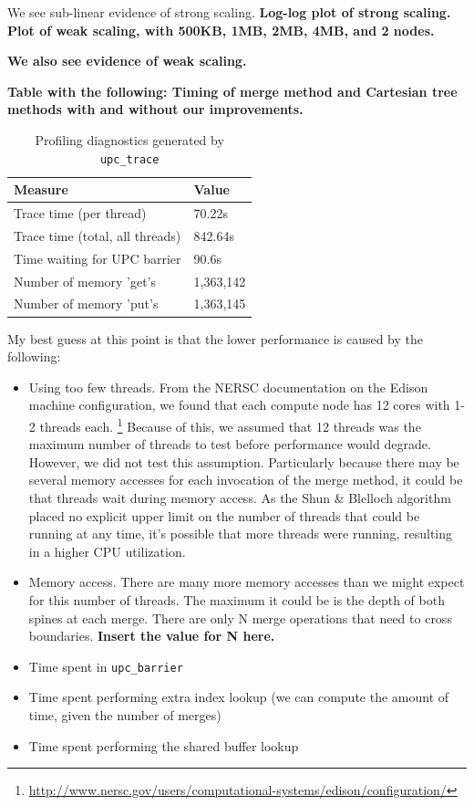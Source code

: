\documentclass[10pt]{article}
\begin{document}
We see sub-linear evidence of strong scaling.
\textbf{%
Log-log plot of strong scaling.
Plot of weak scaling, with 500KB, 1MB, 2MB, 4MB, and 2 nodes.
}

\textbf{%
We also see evidence of weak scaling.
}

\textbf{%
Table with the following:
Timing of merge method and Cartesian tree methods with and without our improvements.
}

\begin{table}[t]
\caption{Profiling diagnostics generated by \texttt{upc\_trace}}
\vspace{1.5ex}
\label{tab:profiling_diagnostics}
\centering
\begin{tabular}{ll}
\toprule
\textbf{Measure} & \textbf{Value} \\
\midrule
Trace time (per thread) & 70.22s \\ \midrule
Trace time (total, all threads) & 842.64s \\ \midrule
Time waiting for UPC barrier & 90.6s \\ \midrule
Number of memory 'get's & 1,363,142 \\ \midrule
Number of memory 'put's & 1,363,145 \\ \midrule
\end{tabular}
\end{table}

My best guess at this point is that the lower performance is caused by the following:
\begin{itemize}
  \item Using too few threads.
        From the NERSC documentation on the Edison machine configuration, we found that each
        compute node has 12 cores with 1-2 threads each.
        \footnote{\url{http://www.nersc.gov/users/computational-systems/edison/configuration/}}
        Because of this, we assumed that 12 threads was the maximum number of threads to test before
        performance would degrade.
        However, we did not test this assumption.
        Particularly because there may be several memory accesses for each invocation of the merge
        method, it could be that threads wait during memory access.
        As the Shun \& Blelloch algorithm placed no explicit upper limit on the number of threads
        that could be running at any time, it's possible that more threads were running, resulting
        in a higher CPU utilization.
  \item Memory access.
        There are many more memory accesses than we might expect for this number of threads.
        The maximum it could be is the depth of both spines at each merge.
        There are only N merge operations that need to cross boundaries.
        \textbf{Insert the value for N here.}
        
  \item Time spent in \texttt{upc\_barrier}
  \item Time spent performing extra index lookup (we can compute the amount of time, given the number of merges)
  \item Time spent performing the shared buffer lookup
\end{itemize}
\end{document}
